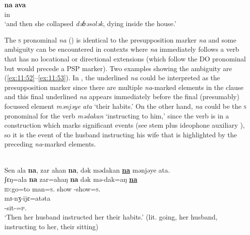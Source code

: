       \medskip 
\gll \textbf{na}   \textbf{ava}\\
{\PSP}  in\\
\glt  ‘and then she collapsed \textit{dəɓəsolək}, dying inside the house.’
\z

The \textsc{s} \DO pronominal \textit{na} () is identical to the presupposition marker \textit{na} and some ambiguity can be encountered in contexts where \textit{na} immediately follows a verb that has no locational or directional extensions (which follow the DO pronominal but would precede a PSP marker). Two examples showing the ambiguity are (\ref{ex:11:52}--\ref{ex:11:53}). In ,  the underlined \textit{na}  could be interpreted as the presupposition marker since there are multiple \textit{na}{}-marked elements in the clause and this final underlined \textit{na} appears immediately before the final (presumably) focussed element \textit{mənjəye ata} ‘their habits.’ On the other hand, \textit{na} could be  the \textsc{s} \DO pronominal for the verb \textit{mədakan} ‘instructing to him,’ since the verb is in a construction which marks significant events (see stem plus ideophone auxiliary ), so it is the event of the husband instructing his wife that is highlighted by the preceding \textit{na}-marked elements.

\ea \label{ex:11:52}
\\
Sen  ala  \textbf{na},  zar  ahan  \textbf{na},  dək  mədakan  \underline{\textbf{na}}  mənjəye  ata.\\
\gll  ʃɛŋ=ala       \textbf{na}  zar=ahaŋ     \textbf{na}  dək        mə-dak=aŋ    \underline{\textbf{na}}    \\     
      \textsc{id}:go=to   {\PSP}   man=\textsc{s}.{\POSS}  {\PSP}   show  {\NOM}-show=\textsc{s}.{\IO}  {\PSP}  \\ 
      
      \medskip 
\gll mɪ-nʒ-ijɛ=atəta \\
     {\NOM}{}-sit-{\CL}=\textsc{p}.{\POSS}\\
\glt  ‘Then her husband instructed her their habits.’ (lit. going, her husband, instructing to her, their sitting)
\z

